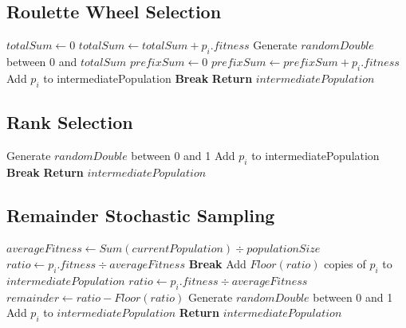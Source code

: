 \documentclass[]{interact}
\theoremstyle{plain} %
\theoremstyle{definition}
\theoremstyle{remark}
\begin{document}
\subsection{Roulette Wheel Selection}

\begin{algorithmic}[1]
    \State $totalSum \leftarrow 0$
        \State $totalSum \leftarrow totalSum + p_{i}.fitness$
    \EndFor
        \State Generate $randomDouble$ between 0 and $totalSum$
        \State $prefixSum \leftarrow 0$
            \State $prefixSum \leftarrow prefixSum + p_i.fitness$
                \State Add $p_i$ to intermediatePopulation
                \State \textbf{Break}
            \EndIf
        \EndFor
    \EndWhile
    \State \textbf{Return} $intermediatePopulation$
	\EndFunction
\end{algorithmic}

\subsection{Rank Selection}

\begin{algorithmic}[1]
            \State Generate $randomDouble$ between 0 and 1
                \State Add $p_i$ to intermediatePopulation
                \State \textbf{Break}
            \EndIf
        \EndFor
    \State \textbf{Return} $intermediatePopulation$
	\EndFunction
\end{algorithmic}

\subsection{Remainder Stochastic Sampling}

\begin{algorithmic}[1]
    \State $averageFitness \leftarrow Sum(currentPopulation) \div populationSize$
        \State $ratio \leftarrow p_i.fitness \div averageFitness$
        \State \textbf{Break}
        \Else
        \State Add $Floor(ratio)$ copies of $p_i$ to $intermediatePopulation$
        \EndIf
    \EndFor
        \State $ratio \leftarrow p_i.fitness \div averageFitness$
        \State $remainder \leftarrow ratio - Floor(ratio)$
        \State Generate $randomDouble$ between 0 and 1
        \State Add $p_i$ to $intermediatePopulation$
        \EndIf
    \EndFor
    \State \textbf{Return} $intermediatePopulation$
	\EndFunction
\end{algorithmic}
\end{document}
